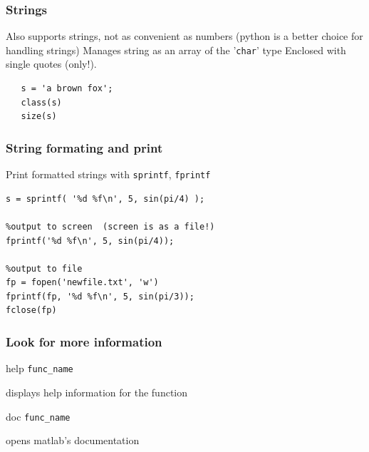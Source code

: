 \documentclass[11pt]{beamer}
\begin{document}
\begin{frame}[fragile]
  \frametitle{Strings}
  \Enlarge

  \begin{enumerate}
  \myitem  Also supports strings, not as convenient as numbers (python is a better choice for handling strings) \pause
  \myitem Manages string as an array of the '\texttt{char}' type \pause
  \myitem  Enclosed with single quotes (only!).
  \end{enumerate}
  
  \begin{Verbatim}
   s = 'a brown fox';
   class(s)
   size(s)
  \end{Verbatim}
\end{frame}

\begin{frame}[fragile]
  \frametitle{String formating and print}
  \Enlarge

  \begin{enumerate}
  \myitem  Print formatted strings with \texttt{sprintf}, \texttt{fprintf}
  \begin{Verbatim}
s = sprintf( '%d %f\n', 5, sin(pi/4) ); 

%output to screen  (screen is as a file!)
fprintf('%d %f\n', 5, sin(pi/4)); 

%output to file
fp = fopen('newfile.txt', 'w')
fprintf(fp, '%d %f\n', 5, sin(pi/3));
fclose(fp)
\end{Verbatim}
\end{enumerate}
  
\end{frame}


\begin{frame}[fragile]
  \frametitle{Look for more information}
  \Enlarge

  \begin{enumerate}
    \myitem  help \texttt{func\_name}   
    	\begin{enumerate}
	\mysubitem displays help information for the function
	\end{enumerate}
    \myitem  doc \texttt{func\_name}   
    	\begin{enumerate}
	\mysubitem opens matlab's documentation
	\end{enumerate}
  \end{enumerate}

\end{frame}
\end{document}

